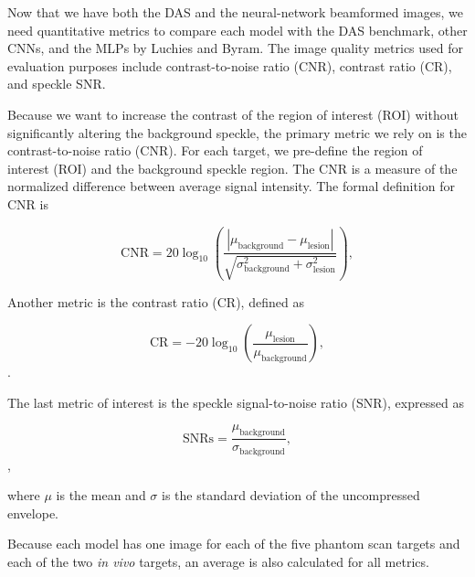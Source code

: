 Now that we have both the DAS and the neural-network beamformed images, we need quantitative metrics to compare each model with the DAS benchmark, other CNNs, and the MLPs by Luchies and Byram. The image quality metrics used for evaluation purposes include contrast-to-noise ratio (CNR), contrast ratio (CR), and speckle SNR.

Because we want to increase the contrast of the region of interest (ROI) without significantly altering the background speckle, the primary metric we rely on is the contrast-to-noise ratio (CNR). For each target, we pre-define the region of interest (ROI) and the background speckle region. The CNR is a measure of the normalized difference between average signal intensity. The formal definition for CNR is


\begin{equation*}
  \textrm {CNR} = 20 \log _{10} \left ({\frac {|\mu _{\text {background}} - \mu _{\text {lesion}}|}{\sqrt {\sigma ^{2}_{\text {background}} + \sigma ^{2}_{\text {lesion}}}} }\right),\tag{4}
\end{equation*}

Another metric is the contrast ratio (CR), defined as

\begin{equation*}
  \textrm {CR} = -20 \log _{10} \left ({\frac {\mu _{\text {lesion}}}{\mu _{\text {background}}} }\right),\tag{3}
\end{equation*}.


The last metric of interest is the speckle signal-to-noise ratio (SNR), expressed as


\begin{equation*} \textrm {SNRs} = \frac {\mu _{\text {background}}}{\sigma _{\text {background}}},\tag{5}
\end{equation*},

where $\mu$ is the mean and $\sigma$ is the standard deviation of the uncompressed envelope.

Because each model has one image for each of the five phantom scan targets and each of the two \textit{in vivo} targets, an average is also calculated for all metrics.


%
